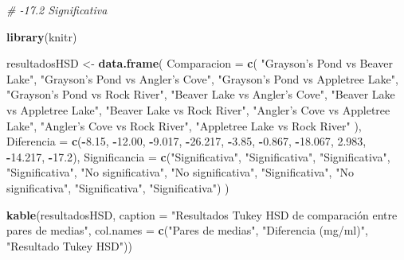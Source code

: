 \documentclass[
]{article}
\newenvironment{Shaded}{\begin{snugshade}}{\end{snugshade}}
\newcommand{\AttributeTok}[1]{\textcolor[rgb]{0.13,0.29,0.53}{#1}}
\newcommand{\CommentTok}[1]{\textcolor[rgb]{0.56,0.35,0.01}{\textit{#1}}}
\newcommand{\FloatTok}[1]{\textcolor[rgb]{0.00,0.00,0.81}{#1}}
\newcommand{\FunctionTok}[1]{\textcolor[rgb]{0.13,0.29,0.53}{\textbf{#1}}}
\newcommand{\NormalTok}[1]{#1}
\newcommand{\OtherTok}[1]{\textcolor[rgb]{0.56,0.35,0.01}{#1}}
\newcommand{\SpecialCharTok}[1]{\textcolor[rgb]{0.81,0.36,0.00}{\textbf{#1}}}
\newcommand{\StringTok}[1]{\textcolor[rgb]{0.31,0.60,0.02}{#1}}
\begin{document}
\begin{Shaded}
\begin{Highlighting}[]
\CommentTok{\# {-}17.2 Significativa}

\FunctionTok{library}\NormalTok{(knitr)}

\NormalTok{resultadosHSD }\OtherTok{\textless{}{-}} \FunctionTok{data.frame}\NormalTok{(}
  \AttributeTok{Comparacion =} \FunctionTok{c}\NormalTok{(}
    \StringTok{"Grayson’s Pond vs Beaver Lake"}\NormalTok{,}
    \StringTok{"Grayson’s Pond vs Angler’s Cove"}\NormalTok{,}
    \StringTok{"Grayson’s Pond vs Appletree Lake"}\NormalTok{,}
    \StringTok{"Grayson’s Pond vs Rock River"}\NormalTok{,}
    \StringTok{"Beaver Lake vs Angler’s Cove"}\NormalTok{,}
    \StringTok{"Beaver Lake vs Appletree Lake"}\NormalTok{,}
    \StringTok{"Beaver Lake vs Rock River"}\NormalTok{,}
    \StringTok{"Angler’s Cove vs Appletree Lake"}\NormalTok{,}
    \StringTok{"Angler’s Cove vs Rock River"}\NormalTok{,}
    \StringTok{"Appletree Lake vs Rock River"}
\NormalTok{  ),}
  \AttributeTok{Diferencia =} \FunctionTok{c}\NormalTok{(}\SpecialCharTok{{-}}\FloatTok{8.15}\NormalTok{, }\SpecialCharTok{{-}}\FloatTok{12.00}\NormalTok{, }\SpecialCharTok{{-}}\FloatTok{9.017}\NormalTok{, }\SpecialCharTok{{-}}\FloatTok{26.217}\NormalTok{, }\SpecialCharTok{{-}}\FloatTok{3.85}\NormalTok{, }\SpecialCharTok{{-}}\FloatTok{0.867}\NormalTok{, }\SpecialCharTok{{-}}\FloatTok{18.067}\NormalTok{, }\FloatTok{2.983}\NormalTok{, }\SpecialCharTok{{-}}\FloatTok{14.217}\NormalTok{, }\SpecialCharTok{{-}}\FloatTok{17.2}\NormalTok{),}
  \AttributeTok{Significancia =} \FunctionTok{c}\NormalTok{(}\StringTok{"Significativa"}\NormalTok{, }\StringTok{"Significativa"}\NormalTok{, }\StringTok{"Significativa"}\NormalTok{, }\StringTok{"Significativa"}\NormalTok{,}
                    \StringTok{"No significativa"}\NormalTok{, }\StringTok{"No significativa"}\NormalTok{, }\StringTok{"Significativa"}\NormalTok{,}
                    \StringTok{"No significativa"}\NormalTok{, }\StringTok{"Significativa"}\NormalTok{, }\StringTok{"Significativa"}\NormalTok{)}
\NormalTok{)}

\FunctionTok{kable}\NormalTok{(resultadosHSD, }\AttributeTok{caption =} \StringTok{"Resultados Tukey HSD de comparación entre pares de medias"}\NormalTok{,}
      \AttributeTok{col.names =} \FunctionTok{c}\NormalTok{(}\StringTok{"Pares de medias"}\NormalTok{, }\StringTok{"Diferencia (mg/ml)"}\NormalTok{, }\StringTok{"Resultado Tukey HSD"}\NormalTok{))}
\end{Highlighting}
\end{Shaded}
\end{document}
